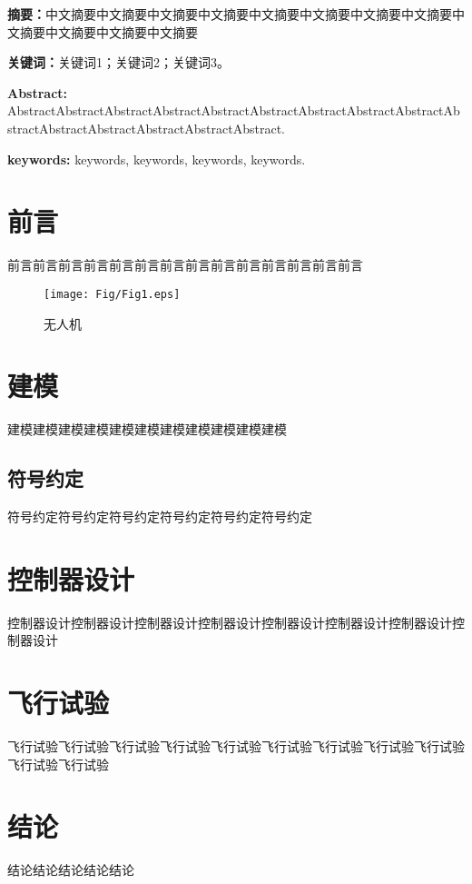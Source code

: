 





\textbf{摘要：}中文摘要中文摘要中文摘要中文摘要中文摘要中文摘要中文摘要中文摘要中文摘要中文摘要中文摘要中文摘要

\textbf{关键词：}关键词1；关键词2；关键词3。

\textbf{Abstract:} AbstractAbstractAbstractAbstractAbstractAbstractAbstractAbstractAbstractAbstractAbstractAbstractAbstractAbstractAbstract.

\textbf{keywords: }keywords, keywords, keywords, keywords.
\setlength{\parindent}{2em} 
\section{前言}
\label{intro}
前言前言前言前言前言前言前言前言前言前言前言前言前言前言
\begin{figure}[!h]
	\centering
	\texttt{[image: Fig/Fig1.eps]}
	\caption{无人机}
	\label{fig:1}     
\end{figure}
\section{建模}
\label{sec:1}
建模建模建模建模建模建模建模建模建模建模建模

\subsection{符号约定}
符号约定符号约定符号约定符号约定符号约定符号约定

\section{控制器设计}
控制器设计控制器设计控制器设计控制器设计控制器设计控制器设计控制器设计控制器设计

\section{飞行试验}
飞行试验飞行试验飞行试验飞行试验飞行试验飞行试验飞行试验飞行试验飞行试验飞行试验飞行试验
\section{结论}
结论结论结论结论结论